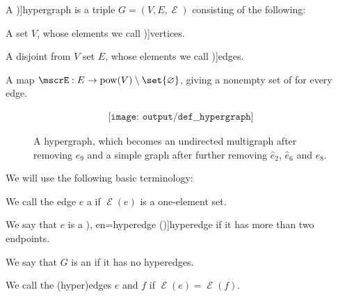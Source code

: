 \begin{definition}\label{def:hypergraph}
  A \term[ru=гиперграф (\cite[298]{ЕмеличевИПр1990ТеорияГрафов})]{hypergraph} is a triple \( G = (V, E, \mscrE) \) consisting of the following:
  \begin{thmenum}[series=def:hypergraph]
     A set \( V \), whose elements we call \term[ru=вершины (\cite[298]{ЕмеличевИПр1990ТеорияГрафов})]{vertices}.

     A disjoint from \( V \) set \( E \), whose elements we call \term[ru=рёбра (\cite[298]{ЕмеличевИПр1990ТеорияГрафов})]{edges}.

     A map \( \mscrE: E \to \pow(V) \setminus \set{ \varnothing } \), giving a nonempty set of  for every edge.
  \end{thmenum}

  \begin{figure}[!ht]
    \begin{equation}\label{eq:fig:def:hypergraph}
      \begin{aligned}
        \texttt{[image: output/def\_\_hypergraph]}
      \end{aligned}
    \end{equation}
    \caption{A hypergraph, which becomes an undirected multigraph after removing \( e_9 \) and a simple graph after further removing \( \widehat{e}_2 \), \( \widehat{e}_6 \) and \( e_8 \).}\label{fig:def:hypergraph}
  \end{figure}

  We will use the following basic terminology:
  \begin{thmenum}[resume=def:hypergraph]
     We call the edge \( e \) a  if \( \mscrE(e) \) is a one-element set.

     We say that \( e \) is a \term[ru=гипердуги (\cite[\S 7.1.5]{Новиков2013ДискретнаяМатематика}), en=hyperedge (\cite[7]{Bollobás1998ModernGraphTheory})]{hyperedge} if it has more than two endpoints.

     We say that \( G \) is an  if it has no hyperedges.

    \mimprovised We call the (hyper)edges \( e \) and \( f \)  if \( \mscrE(e) = \mscrE(f) \).


\end{thmenum}
\end{definition}
